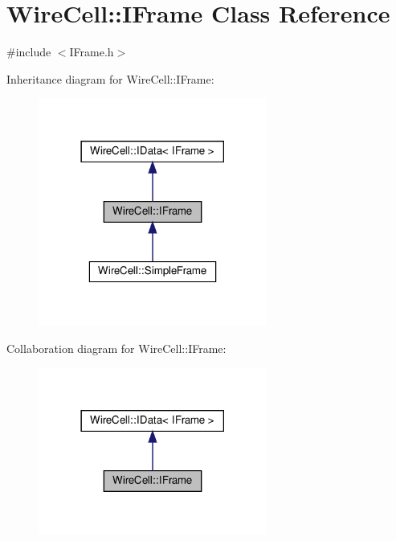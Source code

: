 \hypertarget{class_wire_cell_1_1_i_frame}{}\section{Wire\+Cell\+:\+:I\+Frame Class Reference}
\label{class_wire_cell_1_1_i_frame}


{\ttfamily \#include $<$I\+Frame.\+h$>$}



Inheritance diagram for Wire\+Cell\+:\+:I\+Frame\+:
\nopagebreak
\begin{figure}[H]
\begin{center}
\leavevmode
\includegraphics[width=213pt]{class_wire_cell_1_1_i_frame__inherit__graph}
\end{center}
\end{figure}


Collaboration diagram for Wire\+Cell\+:\+:I\+Frame\+:
\nopagebreak
\begin{figure}[H]
\begin{center}
\leavevmode
\includegraphics[width=213pt]{class_wire_cell_1_1_i_frame__coll__graph}
\end{center}
\end{figure}
